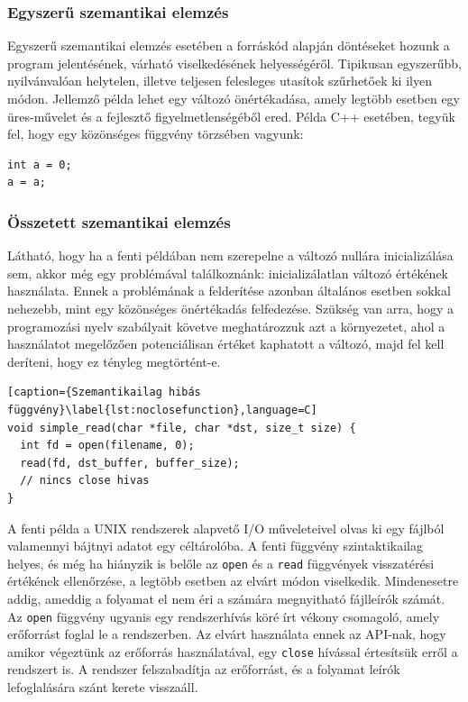 \documentclass[a4paper,12pt]{report}
\begin{document}
\subsubsection{Egyszerű szemantikai elemzés}
Egyszerű szemantikai elemzés esetében a forráskód alapján döntéseket hozunk a program jelentésének, várható viselkedésének helyességéről. Tipikusan egyszerűbb, nyilvánvalóan helytelen, illetve teljesen felesleges utasítok szűrhetőek ki ilyen módon. Jellemző példa lehet egy változó önértékadása, amely legtöbb esetben egy üres-művelet és a fejlesztő figyelmetlenségéből ered.
Példa C++ esetében, tegyük fel, hogy egy közönséges függvény törzsében vagyunk:
\begin{lstlisting}
int a = 0;
a = a;
\end{lstlisting}
\subsubsection{Összetett szemantikai elemzés}
Látható, hogy ha a fenti példában nem szerepelne a változó nullára inicializálása sem, akkor még egy problémával találkoznánk: inicializálatlan változó értékének használata. Ennek a problémának a felderítése azonban általános esetben sokkal nehezebb, mint egy közönséges önértékadás felfedezése. Szükség van arra, hogy a programozási nyelv szabályait követve meghatározzuk azt a környezetet, ahol a használatot megelőzően potenciálisan értéket kaphatott a változó, majd fel kell deríteni, hogy ez tényleg megtörtént-e.
\begin{lstlisting}[caption={Szemantikailag hibás függvény}\label{lst:noclosefunction},language=C]
void simple_read(char *file, char *dst, size_t size) {
  int fd = open(filename, 0);
  read(fd, dst_buffer, buffer_size);
  // nincs close hivas
}
\end{lstlisting}
A fenti példa a UNIX rendszerek alapvető I/O műveleteivel olvas ki egy fájlból valamennyi bájtnyi adatot egy céltárolóba. A fenti függvény szintaktikailag helyes, és még ha hiányzik is belőle az \texttt{open} és a \texttt{read} függvények visszatérési értékének ellenőrzése, a legtöbb esetben az elvárt módon viselkedik. Mindenesetre addig, ameddig a folyamat el nem éri a számára megnyitható fájlleírók számát. Az \texttt{open} függvény ugyanis egy rendszerhívás köré írt vékony csomagoló, amely erőforrást foglal le a rendszerben. Az elvárt használata ennek az API-nak, hogy amikor végeztünk az erőforrás használatával, egy \texttt{close} hívással értesítsük erről a rendszert is. A rendszer felszabadítja az erőforrást, és a folyamat leírók lefoglalására szánt kerete visszaáll.
\end{document}
